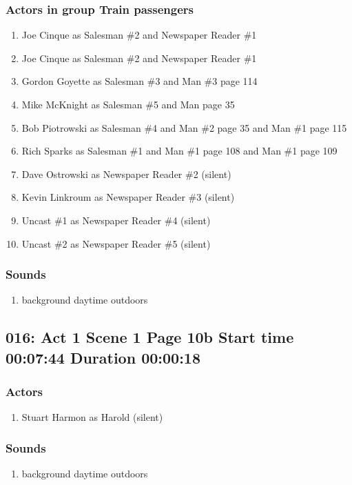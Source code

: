 \subsubsection{Actors in group Train passengers}
\begin{enumerate}
\item Joe Cinque as Salesman \#2 and Newspaper Reader \#1
\item Joe Cinque as Salesman \#2 and Newspaper Reader \#1
\item Gordon Goyette as Salesman \#3 and Man \#3 page 114
\item Mike McKnight as Salesman \#5 and Man page 35
\item Bob Piotrowski as Salesman \#4 and Man \#2 page 35 and Man \#1 page 115
\item Rich Sparks as Salesman \#1 and Man \#1 page 108 and Man \#1 page 109
\item Dave Ostrowski as Newspaper Reader \#2 (silent)
\item Kevin Linkroum as Newspaper Reader \#3 (silent)
\item Uncast \#1 as Newspaper Reader \#4 (silent)
\item Uncast \#2 as Newspaper Reader \#5 (silent)
\end{enumerate}

\subsubsection{Sounds}
\begin{enumerate}
\item background daytime outdoors
\end{enumerate}
\subsection{016: Act 1 Scene 1 Page 10b Start time 00:07:44 Duration 00:00:18}

\subsubsection{Actors}
\begin{enumerate}
\item Stuart Harmon as Harold (silent)
\end{enumerate}

\subsubsection{Sounds}
\begin{enumerate}
\item background daytime outdoors
\end{enumerate}
